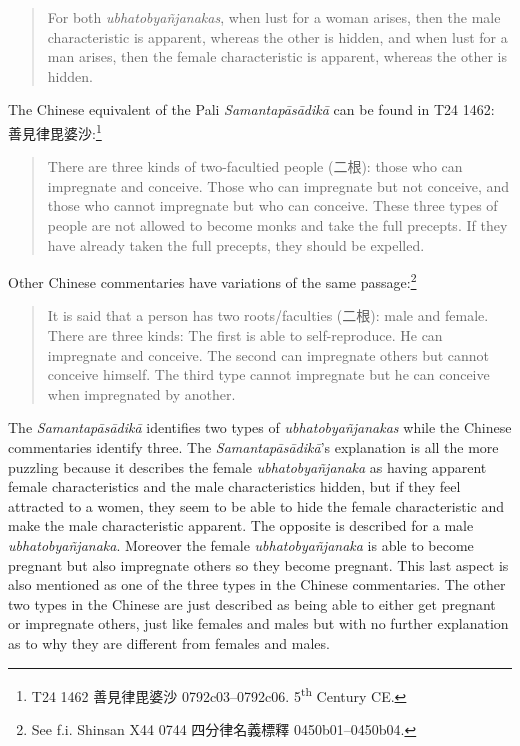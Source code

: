 \begin{quote}
For both {\em ubhatob­yañ­janakas}, when lust for a woman arises, then the male characteristic is apparent, whereas the other is hidden, and when lust for a man arises, then the female characteristic is apparent, whereas the other is hidden.
\end{quote}

The Chinese equivalent of the Pali {\em Samantapāsādikā} can be found in T24 1462: 善見律毘婆沙:\footnote{T24 1462 善見律毘婆沙 0792c03–0792c06. 5\textsuperscript{th} Century CE.}
\begin{quote}
There are three kinds of two-facultied people (二根): those who can impregnate and conceive. Those who can impregnate but not conceive, and those who cannot impregnate but who can conceive. These three types of people are not allowed to become monks and take the full precepts. If they have already taken the full precepts, they should be expelled.
\end{quote}

Other Chinese commentaries have variations of the same passage:\footnote{See f.i. Shinsan X44 0744 四分律名義標釋 0450b01–0450b04.}
\begin{quote}
It is said that a person has two roots/faculties (二根): male and female. There are three kinds: The first is able to self-reproduce. He can impregnate and conceive. The second can impregnate others but cannot conceive himself. The third type cannot impregnate but he can conceive when impregnated by another. 
\end{quote}

The {\em Samantapāsādikā} identifies two types of {\em ubhatob­yañ­janakas} while the Chinese commentaries identify three. The {\em Samantapāsādikā}'s explanation is all the more puzzling because it describes the female {\em ubhatob­yañ­janaka} as having apparent female characteristics and the male characteristics hidden, but if they feel attracted to a women, they seem to be able to hide the female characteristic and make the male characteristic apparent. The opposite is described for a male {\em ubhatob­yañ­janaka}. Moreover the female {\em ubhatob­yañ­janaka} is able to become pregnant but also impregnate others so they become pregnant. This last aspect is also mentioned as one of the three types in the Chinese commentaries. The other two types in the Chinese are just described as being able to either get pregnant or impregnate others, just like females and males but with no further explanation as to why they are different from females and males. 

